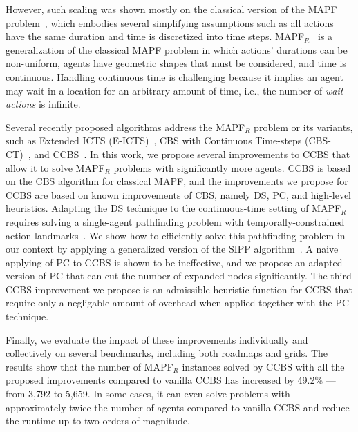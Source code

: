\documentclass[letterpaper]{article} %
\newcommand{\cbs}{\ac{CBS}\xspace}
\newcommand{\ccbs}{\ac{CCBS}\xspace}
\newcommand{\sipp}{\ac{SIPP}\xspace}
\newcommand{\mapfr}{{MAPF}$_R$\xspace}
\newcommand{\mapf}{\ac{MAPF}\xspace}
\newcommand{\pc}{\ac{PC}\xspace}
\newcommand{\ds}{\ac{DS}\xspace}
\begin{document}
However, such scaling was shown mostly on the classical version of the \mapf problem~\cite{stern2019multi}, which embodies several simplifying assumptions such as all actions have the same duration and time is discretized into time steps. \mapfr~\cite{walker2018extended} is a generalization of the classical \mapf problem in which actions' durations can be non-uniform, agents have geometric shapes that must be considered, and time is continuous. 
Handling continuous time is challenging because it implies an agent may wait in a location for an arbitrary amount of time, i.e., the number of \emph{wait actions} is infinite.  

Several recently proposed algorithms address the \mapfr problem or its variants, such as Extended ICTS (E-ICTS)~\cite{walker2018extended}, CBS with Continuous Time-steps (CBS-CT)~\cite{cohen2019optimal}, and 
\ccbs~\cite{andreychuk2019multi}. 
In this work, we propose several improvements to \ccbs that allow it to solve \mapfr problems with significantly more agents. 
\ccbs is based on the \cbs algorithm for classical \mapf, and the improvements we propose for \ccbs are based on known improvements of \cbs, namely \ds, \pc, and high-level heuristics. 
Adapting the \ds technique to the continuous-time setting of \mapfr requires solving a single-agent pathfinding problem with temporally-constrained action landmarks~\cite{karpas2009cost}. 
We show how to efficiently solve this pathfinding problem in our context by applying a generalized version of the \sipp algorithm~\cite{phillips2011sipp}. 
A naive applying of \pc to \ccbs is shown to be ineffective, and we propose an adapted version of \pc that can cut the number of expanded nodes significantly. 
The third \ccbs improvement we propose is an admissible heuristic function for \ccbs that require only a negligable amount of overhead when applied together with the \pc technique. 


Finally, we evaluate the impact of these improvements individually and collectively on several benchmarks, including both roadmaps and grids. 
The results show that the number of \mapfr instances solved by \ccbs with all the proposed improvements compared to vanilla CCBS
has increased by 49.2\% --- from 3,792 to 5,659. 
In some cases, it can even solve problems with approximately twice the number of agents compared to vanilla CCBS and reduce the runtime up to two orders of magnitude.
\end{document}
